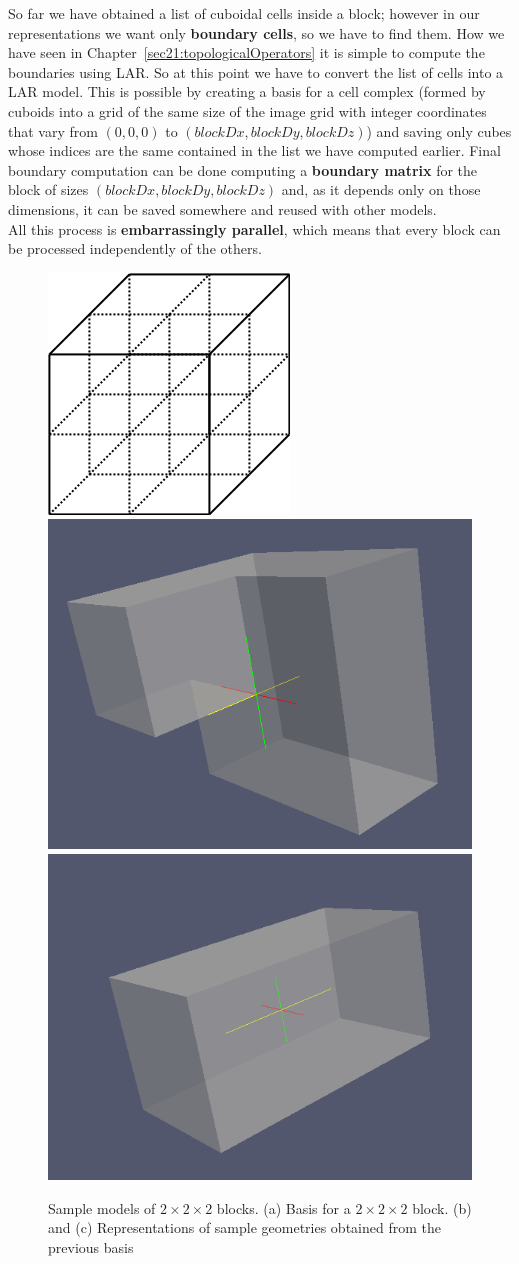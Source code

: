 So far we have obtained a list of cuboidal cells inside a block; however in our representations we want only \textbf{boundary cells}, so we have to find them. How we have seen in Chapter~\ref{sec21:topologicalOperators} it is simple to compute the boundaries using LAR. So at this point we have to convert the list of cells into a LAR model. This is possible by creating a basis for a cell complex (formed by cuboids into a grid of the same size of the image grid with integer coordinates that vary from $(0,0,0)$ to $(blockDx, blockDy, blockDz)$) and saving only cubes whose indices are the same contained in the list we have computed earlier. Final boundary computation can be done computing a \textbf{boundary matrix} for the block of sizes $(blockDx, blockDy, blockDz)$ and, as it depends only on those dimensions, it can be saved somewhere and reused with other models.\\

All this process is \textbf{embarrassingly parallel}, which means that every block can be processed independently of the others.

\begin{figure}[htb] %
   \centering
   \includegraphics[width=0.25\linewidth]{images/larbasis.png}\hfill
   \includegraphics[width=0.30\linewidth]{images/sampleBlock1.png}\hfill
   \includegraphics[width=0.30\linewidth]{images/sampleBlock2.png}
   \caption[Sample models of $2 \times 2 \times 2$ blocks]{Sample models of $2 \times 2 \times 2$ blocks. (a) Basis for a $2 \times 2 \times 2$ block. (b) and (c) Representations of sample geometries obtained from the previous basis}
   \label{fig:sampleBlocks}
\end{figure}

